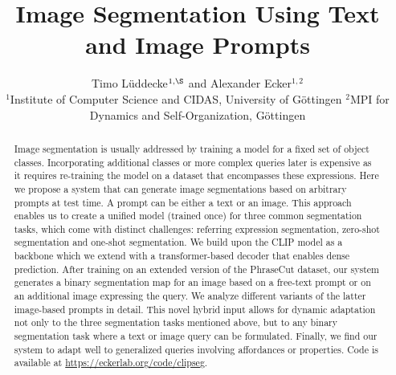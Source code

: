 \documentclass[10pt,twocolumn,letterpaper]{article}
\begin{document}
\title{
Image Segmentation Using Text and Image Prompts
}

\date{}

\author{
Timo Lüddecke$^{1,\S}$ and Alexander Ecker$^{1,2}$ \\
\small $^1$Institute of Computer Science and CIDAS, University of Göttingen \hspace{1cm}
\small$^2$MPI for Dynamics and Self-Organization, Göttingen
}


\maketitle


\def\todo#1{{ \color{blue}{TODO: #1} } }
\def\new{{ \color{red}{new} } }
\def\remark#1{{ \color{cyan}{#1} } }
\def\question#1{{ \color{orange}{Q: #1} } }

\def\conf#1{}

\newcommand{\x}{\mathbf{x}}
\newcommand{\y}{\mathbf{y}}
\newcommand{\xv}{\mathbf{x}}
\newcommand{\yv}{\mathbf{y}}
\newcommand{\tv}{\mathbf{t}}
\newcommand{\cv}{\mathbf{c}}
\newcommand{\pred}{\mathbf{p}}
\newcommand{\gt}{\mathbf{g}}
\newcommand{\miou}{\text{mIoU}}
\newcommand{\ioufg}{\text{IoU}_{\text{FG}}}
\newcommand{\ioubin}{\text{IoU}_{\text{BIN}}}





\begin{abstract}


Image segmentation is usually addressed by training a model for a fixed set of object classes. Incorporating additional classes or more complex queries later is expensive as it requires re-training the model on a dataset that encompasses these expressions.
Here we propose a system that can generate image segmentations based on arbitrary prompts at test time.
A prompt can be either a text or an image. This approach enables us to create a unified model (trained once) for three common segmentation tasks, which come with distinct challenges: referring expression segmentation, zero-shot segmentation and one-shot segmentation.
We build upon the CLIP model as a backbone which we extend with a transformer-based decoder that enables dense prediction. After training on an extended version of the PhraseCut dataset, our system generates a binary segmentation map for an image based on a free-text prompt or on an additional image expressing the query. 
We analyze different variants of the latter image-based prompts in detail.
This novel hybrid input allows for dynamic adaptation not only to the three segmentation tasks mentioned above, but to any binary segmentation task where a text or image query can be formulated.
Finally, we find our system to adapt well to generalized queries involving affordances or properties.
Code is available at \url{https://eckerlab.org/code/clipseg}.

\end{abstract}
\end{document}
